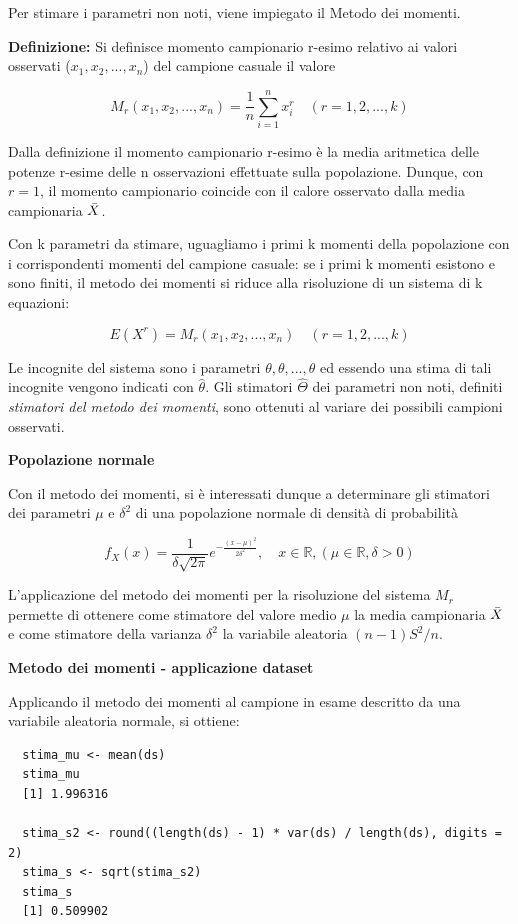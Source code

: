 Per stimare i parametri non noti, viene impiegato il Metodo dei momenti.

\textbf{Definizione:} Si definisce momento campionario r-esimo relativo ai valori osservati ($x_1, x_2, ..., x_n$) del campione casuale il valore

\[M_r(x_1, x_2, ..., x_n) = \frac{1}{n}\sum_{i=1}^n x_i^r \quad (r = 1, 2, ..., k)\]

Dalla definizione il momento campionario r-esimo è la media aritmetica delle potenze r-esime delle n osservazioni effettuate sulla popolazione. Dunque, con $r = 1$, il momento campionario coincide con il calore osservato dalla media campionaria $\Bar{X}$.

Con k parametri da stimare, uguagliamo i primi k momenti della popolazione con i corrispondenti momenti del campione casuale: se i primi k momenti esistono e sono finiti, il metodo dei momenti si riduce alla risoluzione di un sistema di k equazioni:

\[E(X^r) = M_r(x_1, x_2, ..., x_n) \quad (r = 1, 2, ..., k)\]

Le incognite del sistema sono i parametri $\theta, \theta, ..., \theta$ ed essendo una stima di tali incognite vengono indicati con $\hat{\theta}$. Gli stimatori $\hat{\Theta}$ dei parametri non noti, definiti \textit{stimatori del metodo dei momenti}, sono ottenuti al variare dei possibili campioni osservati.

\vspace{5mm}
\noindent \textbf{Popolazione normale}

Con il metodo dei momenti, si è interessati dunque a determinare gli stimatori dei parametri $\mu$ e $\delta^2$ di una popolazione normale di densità di probabilità

\[f_X(x) = \frac{1}{\delta \sqrt{2\pi}} e^{-\frac{(x - \mu)^2}{{2\delta}^2}}, \quad x \in \mathbb{R}, (\mu \in \mathbb{R}, \delta > 0)\]

L'applicazione del metodo dei momenti per la risoluzione del sistema $M_r$ permette di ottenere come stimatore del valore medio $\mu$ la media campionaria $\Bar{X}$ e come stimatore della varianza $\delta^2$ la variabile aleatoria $(n-1)S^2/n$.

\vspace{5mm}
\noindent \textbf{Metodo dei momenti - applicazione dataset}

Applicando il metodo dei momenti al campione in esame descritto da una variabile aleatoria normale, si ottiene: 

\vspace{5mm}
\begin{lstlisting}
  stima_mu <- mean(ds)
  stima_mu
  [1] 1.996316

  stima_s2 <- round((length(ds) - 1) * var(ds) / length(ds), digits = 2)
  stima_s <- sqrt(stima_s2)
  stima_s
  [1] 0.509902
\end{lstlisting}
\vspace{5mm}

